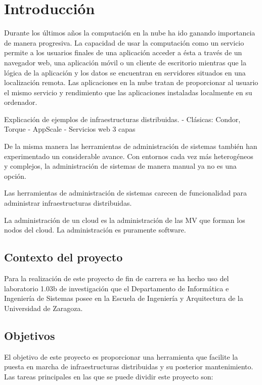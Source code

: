 \chapter{Introducción}
\label{cap:introduccion}

{\sf

Durante los últimos años la computación en la nube ha ido ganando importancia de manera progresiva. La capacidad de usar la computación como un servicio permite a los usuarios finales de una aplicación acceder a ésta a través de un navegador web, una aplicación móvil o un cliente de escritorio mientras que la lógica de la aplicación y los datos se encuentran en servidores situados en una localización remota. Las aplicaciones en la nube tratan de proporcionar al usuario el mismo servicio y rendimiento que las aplicaciones instaladas localmente en su ordenador.

Explicación de ejemplos de infraestructuras distribuidas.
 - Clásicas: Condor, Torque
 - AppScale
 - Servicios web 3 capas

De la misma manera las herramientas de administración de sistemas también han experimentado un considerable avance. Con entornos cada vez más heterogéneos y complejos, la administración de sistemas de manera manual ya no es una opción.

Las herramientas de administración de sistemas carecen de funcionalidad para administrar infraestructuras distribuidas.

La administración de un cloud es la administración de las MV que forman los nodos del cloud. La administración es puramente software.

\section{Contexto del proyecto}

Para la realización de este proyecto de fin de carrera se ha hecho uso del laboratorio 1.03b de investigación que el Departamento de Informática e Ingeniería de Sistemas posee en la Escuela de Ingeniería y Arquitectura de la Universidad de Zaragoza.

\section{Objetivos}

El objetivo de este proyecto es proporcionar una herramienta que facilite la puesta en marcha de infraestructuras distribuidas y su posterior mantenimiento. Las tareas principales en las que se puede dividir este proyecto son:

}
